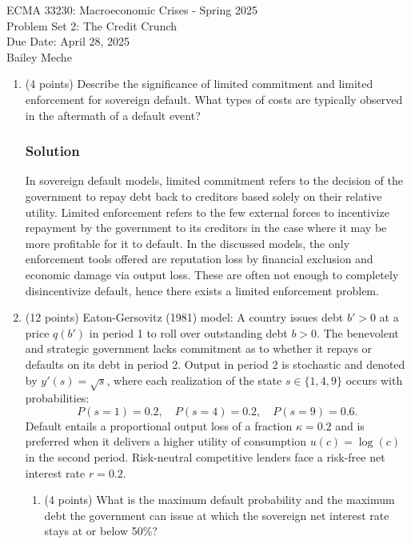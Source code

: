 \documentclass[12pt]{article}
\begin{document}
	\begin{center}
		ECMA 33230: Macroeconomic Crises - Spring 2025\\
        Problem Set 2: The Credit Crunch \\
		Due Date: April 28, 2025 \\
        Bailey Meche
	\end{center}

\begin{enumerate}
        \item (4 points) Describe the significance of limited commitment and limited enforcement for sovereign default. What types of costs are typically observed in the aftermath of a default event?
    \subsubsection*{Solution}

    In sovereign default models, limited commitment refers to the decision of the government to repay debt back to creditors based solely on their relative utility. Limited enforcement refers to the few external forces to incentivize repayment by the government to its creditors in the case where it may be more profitable for it to default. In the discussed models, the only enforcement tools offered are reputation loss by financial exclusion and economic damage via output loss. These are often not enough to completely disincentivize default, hence there exists a limited enforcement problem. 

    
    \item (12 points) {Eaton-Gersovitz (1981) model:} A country issues debt $b' > 0$ at a price $q(b')$ in period 1 to roll over outstanding debt $b > 0$. The benevolent and strategic government lacks commitment as to whether it repays or defaults on its debt in period 2. Output in period 2 is stochastic and denoted by $y'(s) = \sqrt{s}$, where each realization of the state $s \in \{1, 4, 9\}$ occurs with probabilities:
    \[
    P(s=1) = 0.2, \quad P(s=4) = 0.2, \quad P(s=9) = 0.6.
    \]
    Default entails a proportional output loss of a fraction $\kappa = 0.2$ and is preferred when it delivers a higher utility of consumption $u(c) = \log(c)$ in the second period. Risk-neutral competitive lenders face a risk-free net interest rate $r = 0.2$.

    \begin{enumerate}[label=(\alph*)]
        \item (4 points) What is the maximum default probability and the maximum debt the government can issue at which the sovereign net interest rate stays at or below 50\%?

\end{enumerate}
\end{enumerate}
\end{document}
